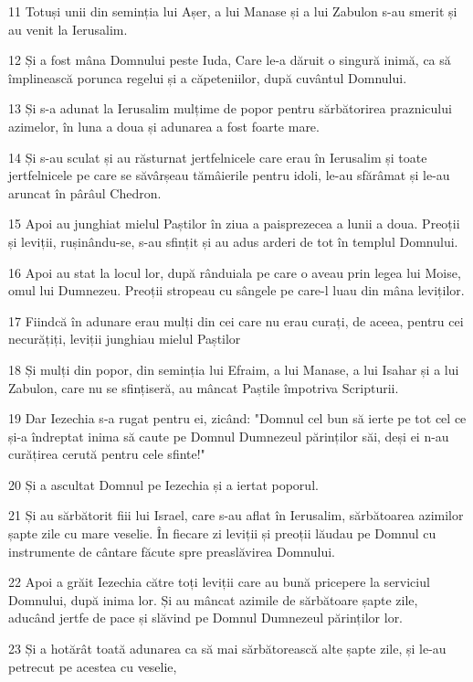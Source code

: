 \par 11 Totuși unii din seminția lui Așer, a lui Manase și a lui Zabulon s-au smerit și au venit la Ierusalim.
\par 12 Și a fost mâna Domnului peste Iuda, Care le-a dăruit o singură inimă, ca să împlinească porunca regelui și a căpeteniilor, după cuvântul Domnului.
\par 13 Și s-a adunat la Ierusalim mulțime de popor pentru sărbătorirea praznicului azimelor, în luna a doua și adunarea a fost foarte mare.
\par 14 Și s-au sculat și au răsturnat jertfelnicele care erau în Ierusalim și toate jertfelnicele pe care se săvârșeau tămâierile pentru idoli, le-au sfărâmat și le-au aruncat în pârâul Chedron.
\par 15 Apoi au junghiat mielul Paștilor în ziua a paisprezecea a lunii a doua. Preoții și leviții, rușinându-se, s-au sfințit și au adus arderi de tot în templul Domnului.
\par 16 Apoi au stat la locul lor, după rânduiala pe care o aveau prin legea lui Moise, omul lui Dumnezeu. Preoții stropeau cu sângele pe care-l luau din mâna leviților.
\par 17 Fiindcă în adunare erau mulți din cei care nu erau curați, de aceea, pentru cei necurățiți, leviții junghiau mielul Paștilor
\par 18 Și mulți din popor, din seminția lui Efraim, a lui Manase, a lui Isahar și a lui Zabulon, care nu se sfințiseră, au mâncat Paștile împotriva Scripturii.
\par 19 Dar Iezechia s-a rugat pentru ei, zicând: "Domnul cel bun să ierte pe tot cel ce și-a îndreptat inima să caute pe Domnul Dumnezeul părinților săi, deși ei n-au curățirea cerută pentru cele sfinte!"
\par 20 Și a ascultat Domnul pe Iezechia și a iertat poporul.
\par 21 Și au sărbătorit fiii lui Israel, care s-au aflat în Ierusalim, sărbătoarea azimilor șapte zile cu mare veselie. În fiecare zi leviții și preoții lăudau pe Domnul cu instrumente de cântare făcute spre preaslăvirea Domnului.
\par 22 Apoi a grăit Iezechia către toți leviții care au bună pricepere la serviciul Domnului, după inima lor. Și au mâncat azimile de sărbătoare șapte zile, aducând jertfe de pace și slăvind pe Domnul Dumnezeul părinților lor.
\par 23 Și a hotărât toată adunarea ca să mai sărbătorească alte șapte zile, și le-au petrecut pe acestea cu veselie,

